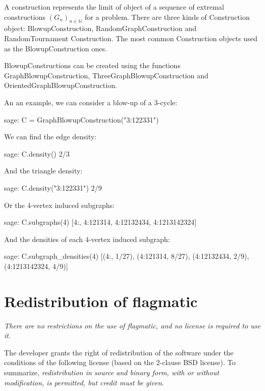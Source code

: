 \documentclass{article}
\begin{document}
A construction represents the limit of object of a sequence of extremal constructions $(G_n)_{n \in \mathbb{N}}$ for a problem. There are three kinds of Construction object: BlowupConstruction, RandomGraphConstruction and RandomTournament Construction. The most common Construction objects used as the BlowupConstruction ones.

BlowupConstructions can be created using the functions GraphBlowupConstruction, ThreeGraphBlowupConstruction and OrientedGraphBlowupConstruction.

An an example, we can consider a blow-up of a 3-cycle:

\begin{sage}
sage: C = GraphBlowupConstruction("3:122331")
\end{sage}

We can find the edge density:

\begin{sage}
sage: C.density()
2/3
\end{sage}

And the triangle density:

\begin{sage}
sage: C.density("3:122331")
2/9
\end{sage}

Or the 4-vertex induced subgraphs:

\begin{sage}
sage: C.subgraphs(4)
[4:, 4:121314, 4:12132434, 4:1213142324]
\end{sage}

And the densities of each 4-vertex induced subgraph:

\begin{sage}
sage: C.subgraph_densities(4)
[(4:, 1/27), (4:121314, 8/27), (4:12132434, 2/9), (4:1213142324, 4/9)]
\end{sage}


\section{Redistribution of flagmatic} \label{license}

\emph{There are no restrictions on the use of flagmatic, and no license is required to use it.}

The developer grants the right of redistribution of the software under the conditions of the following license (based on the 2-clause BSD license). To summarize, \emph{redistribution in source and binary form, with or without modification, is permitted, but credit must be given}.
\end{document}
